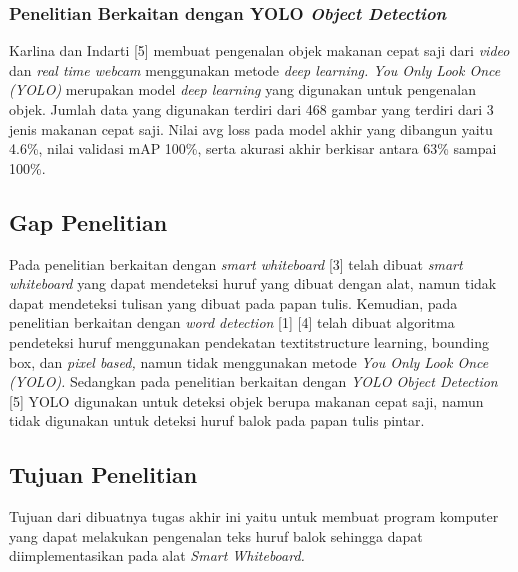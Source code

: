 \subsubsection{Penelitian Berkaitan dengan YOLO \textit{Object Detection}}
Karlina dan Indarti [5] membuat pengenalan objek makanan cepat saji dari \textit{video} dan \textit{real time webcam} menggunakan metode \textit{deep learning. You Only Look Once (YOLO)} merupakan model \textit{deep learning} yang digunakan untuk pengenalan objek. Jumlah data yang digunakan terdiri dari 468 gambar yang terdiri dari 3 jenis makanan cepat saji. Nilai avg loss pada model akhir yang dibangun yaitu 4.6\%, nilai validasi mAP 100\%, serta akurasi akhir berkisar antara 63\% sampai 100\%.

\subsection{Gap Penelitian}
Pada penelitian berkaitan dengan \textit{smart whiteboard} [3] telah dibuat \textit{smart whiteboard} yang dapat mendeteksi huruf yang dibuat dengan alat, namun tidak dapat mendeteksi tulisan yang dibuat pada papan tulis. Kemudian, pada penelitian berkaitan dengan \textit{word detection} [1] [4] telah dibuat algoritma pendeteksi huruf menggunakan pendekatan textit{structure learning, bounding box,} dan \textit{pixel based,} namun tidak menggunakan metode \textit{You Only Look Once (YOLO).} Sedangkan pada penelitian berkaitan dengan \textit{YOLO Object Detection} [5] YOLO digunakan untuk deteksi objek berupa makanan cepat saji, namun tidak digunakan untuk deteksi huruf balok pada papan tulis pintar.

\subsection{Tujuan Penelitian}
Tujuan dari dibuatnya tugas akhir ini yaitu untuk membuat program komputer yang dapat melakukan pengenalan teks huruf balok sehingga dapat diimplementasikan pada alat \textit{Smart Whiteboard.}